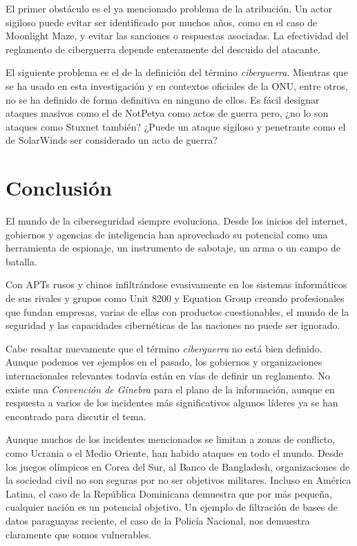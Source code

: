 \documentclass{article}
\begin{document}
El primer obstáculo es el ya mencionado problema de la atribución. Un actor sigiloso puede evitar ser identificado por muchos años, como en el caso de Moonlight Maze, y evitar las sanciones o respuestas asociadas. La efectividad del reglamento de ciberguerra depende enteramente del descuido del atacante. \autocite{pcmag-cyberwar}

El siguiente problema es el de la definición del término {\it ciberguerra}. Mientras que se ha usado en esta investigación y en contextos oficiales de la ONU, entre otros, no se ha definido de forma definitiva en ninguno de ellos. Es fácil designar ataques masivos como el de NotPetya como actos de guerra pero, ¿no lo son ataques como Stuxnet también? ¿Puede un ataque sigiloso y penetrante como el de SolarWinds ser considerado un acto de guerra? \autocite{darknetdiaries-notpetya} \autocite{cnbc-solarwinds}

\section{Conclusión}
El mundo de la ciberseguridad siempre evoluciona. Desde los inicios del internet, gobiernos y agencias de inteligencia han aprovechado su potencial como una herramienta de espionaje, un instrumento de sabotaje, un arma o un campo de batalla.

Con APTs rusos y chinos infiltrándose evasivamente en los sistemas informáticos de sus rivales y grupos como Unit 8200 y Equation Group creando profesionales que fundan empresas, varias de ellas con productos cuestionables, el mundo de la seguridad y las capacidades cibernéticas de las naciones no puede ser ignorado.

Cabe resaltar nuevamente que el término {\it ciberguerra} no está bien definido. Aunque podemos ver ejemplos en el pasado, los gobiernos y organizaciones internacionales relevantes todavía están en vías de definir un reglamento. No existe una {\it Convención de Ginebra} para el plano de la información, aunque en respuesta a varios de los incidentes más significativos algunos líderes ya se han encontrado para discutir el tema.

Aunque muchos de los incidentes mencionados se limitan a zonas de conflicto, como Ucrania o el Medio Oriente, han habido ataques en todo el mundo. Desde los juegos olímpicos en Corea del Sur, al Banco de Bangladesh, organizaciones de la sociedad civil no son seguras por no ser objetivos militares. Incluso en América Latina, el caso de la República Dominicana demuestra que por más pequeña, cualquier nación es un potencial objetivo. Un ejemplo de filtración de bases de datos paraguayas reciente, el caso de la Policía Nacional, nos demuestra claramente que somos vulnerables. \autocite{abc-policia-nacional}


\newpage
\printbibliography
\end{document}
